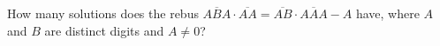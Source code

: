 How many solutions does the rebus $\overline{ABA}\cdot\overline{AA}=\overline{AB}\cdot\overline{AAA}-A$ have, where $A$ and $B$ are distinct digits and $A\neq0$?
